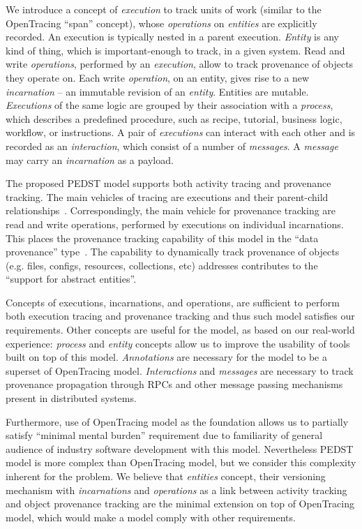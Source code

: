 We introduce a concept of \textit{execution} to track units of work (similar to the OpenTracing ``span''  concept), whose \textit{operations} on \textit{entities} are explicitly recorded. An execution is typically nested in a parent execution. \textit{Entity} is any kind of thing, which is important-enough to track, in a given system. Read and write \textit{operations}, performed by an \textit{execution}, allow to track provenance of objects they operate on. Each write \textit{operation}, on an entity, gives rise to a new \textit{incarnation} -- an immutable revision of an \textit{entity}. Entities are mutable. \textit{Executions} of the same logic are grouped by their association with a \textit{process}, which describes a predefined procedure, such as recipe, tutorial, business logic, workflow, or instructions. A pair of \textit{executions} can interact with each other and is recorded as an \textit{interaction}, which consist of a number of \textit{messages}. A \textit{message} may carry an \textit{incarnation} as a payload.

The proposed PEDST model supports both activity tracing and provenance tracking. The main vehicles of tracing are executions and their parent-child relationships~\cite{dapper2010}. Correspondingly, the main vehicle for provenance tracking are read and write operations, performed by executions on individual incarnations. This places the provenance tracking capability of this model in the ``data provenance'' type~\cite{herschel2017survey}. The capability to dynamically track provenance of objects (e.g. files, configs, resources, collections, etc) addresses contributes to the ``support for abstract entities''.

Concepts of executions, incarnations, and operations, are sufficient to perform both execution tracing and provenance tracking and thus such model satisfies our requirements. Other concepts are useful for the model, as based on our real-world experience: \textit{process} and \textit{entity} concepts allow us to improve the usability of tools built on top of this model. \textit{Annotations} are necessary for the model to be a superset of OpenTracing model. \textit{Interactions} and \textit{messages} are necessary to track provenance propagation through RPCs and other message passing mechanisms present in distributed systems.

Furthermore, use of OpenTracing model as the foundation allows us to partially satisfy ``minimal mental burden'' requirement due to familiarity of general audience of industry software development with this model. Nevertheless PEDST model is more complex than OpenTracing model, but we consider this complexity inherent for the problem. We believe that \textit{entities} concept, their versioning mechanism with \textit{incarnations} and \textit{operations} as a link between activity tracking and object provenance tracking are the minimal extension on top of OpenTracing model, which would make a model comply with other requirements.


